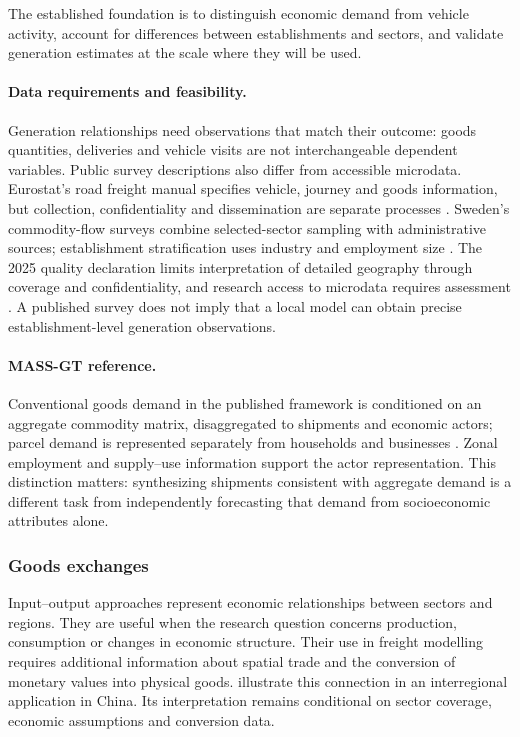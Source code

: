 The established foundation is to distinguish economic demand from vehicle
activity, account for differences between establishments and sectors, and
validate generation estimates at the scale where they will be used.

\paragraph{Data requirements and feasibility.}
Generation relationships need observations that match their outcome: goods
quantities, deliveries and vehicle visits are not interchangeable dependent
variables. Public survey descriptions also differ from accessible microdata.
Eurostat's road freight manual specifies vehicle, journey and goods information,
but collection, confidentiality and dissemination are separate processes
\parencite{eurostat2025}. Sweden's commodity-flow surveys combine selected-sector
sampling with administrative sources; establishment stratification uses industry
and employment size \parencite{trafa2022,trafa2026method}. The 2025 quality
declaration limits interpretation of detailed geography through coverage and
confidentiality, and research access to microdata requires assessment
\parencite{trafa2026quality}. A published survey does not imply that a local
model can obtain precise establishment-level generation observations.


\paragraph{MASS-GT reference.}
Conventional goods demand in the published framework is conditioned on an
aggregate commodity matrix, disaggregated to shipments and economic actors;
parcel demand is represented separately from households and businesses
\parencite{massgt2018,massgt2025}. Zonal employment and supply--use information
support the actor representation. This distinction matters: synthesizing
shipments consistent with aggregate demand is a different task from independently
forecasting that demand from socioeconomic attributes alone.

\subsubsection{Goods exchanges}\label{sec:f3}
Input--output approaches represent economic relationships between sectors and
regions. They are useful when the research question concerns production,
consumption or changes in economic structure. Their use in freight modelling
requires additional information about spatial trade and the conversion of
monetary values into physical goods. \Textcite{li2023} illustrate this connection
in an interregional application in China. Its interpretation remains conditional
on sector coverage, economic assumptions and conversion data.

